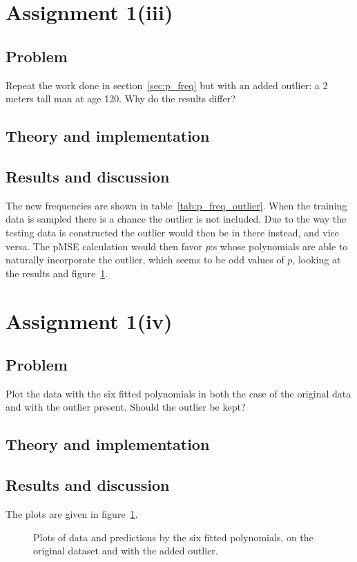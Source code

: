 \documentclass[11pt, a4paper]{article}
\begin{document}
\section{Assignment 1(iii)}
\subsection{Problem}
Repeat the work done in section~\ref{sec:p_freq} but with an added outlier:
a 2 meters tall man at age 120.
Why do the results differ?
\subsection{Theory and implementation}
\subsection{Results and discussion}
The new frequencies are shown in table~\ref{tab:p_freq_outlier}.
When the training data is sampled there is a chance the outlier is not included.
Due to the way the testing data is constructed the outlier would then be in there instead,
and vice versa.
The pMSE calculation would then favor $p$:s whose polynomials are able to naturally
incorporate the outlier,
which seems to be odd values of $p$, looking at the results and figure~\ref{fig:predictions}.

\section{Assignment 1(iv)}
\subsection{Problem}
Plot the data with the six fitted polynomials
in both the case of the original data and with the outlier present.
Should the outlier be kept?
\subsection{Theory and implementation}
\subsection{Results and discussion}
The plots are given in figure~\ref{fig:predictions}.

\begin{figure}
	\centering
	
	\caption{Plots of data and predictions by the six fitted polynomials,
	on the original dataset and with the added outlier. \label{fig:predictions}}
\end{figure}
\end{document}
